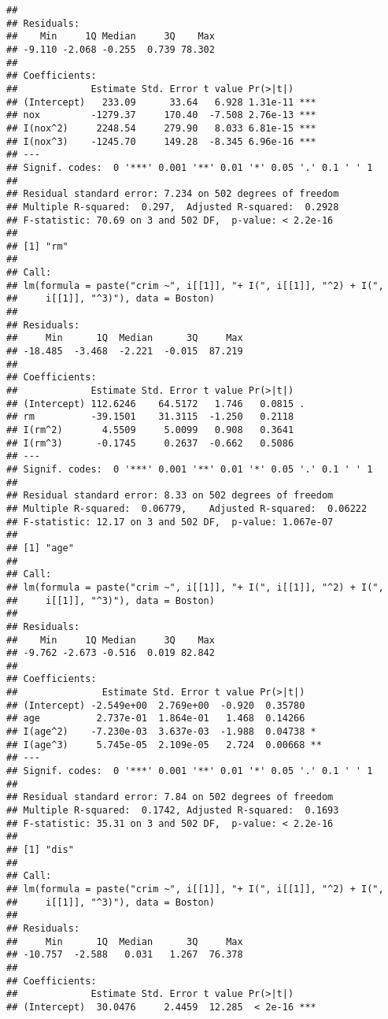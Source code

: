 \documentclass[
]{article}
\begin{document}
\begin{verbatim}
## 
## Residuals:
##    Min     1Q Median     3Q    Max 
## -9.110 -2.068 -0.255  0.739 78.302 
## 
## Coefficients:
##             Estimate Std. Error t value Pr(>|t|)    
## (Intercept)   233.09      33.64   6.928 1.31e-11 ***
## nox         -1279.37     170.40  -7.508 2.76e-13 ***
## I(nox^2)     2248.54     279.90   8.033 6.81e-15 ***
## I(nox^3)    -1245.70     149.28  -8.345 6.96e-16 ***
## ---
## Signif. codes:  0 '***' 0.001 '**' 0.01 '*' 0.05 '.' 0.1 ' ' 1
## 
## Residual standard error: 7.234 on 502 degrees of freedom
## Multiple R-squared:  0.297,  Adjusted R-squared:  0.2928 
## F-statistic: 70.69 on 3 and 502 DF,  p-value: < 2.2e-16
## 
## [1] "rm"
## 
## Call:
## lm(formula = paste("crim ~", i[[1]], "+ I(", i[[1]], "^2) + I(", 
##     i[[1]], "^3)"), data = Boston)
## 
## Residuals:
##     Min      1Q  Median      3Q     Max 
## -18.485  -3.468  -2.221  -0.015  87.219 
## 
## Coefficients:
##             Estimate Std. Error t value Pr(>|t|)  
## (Intercept) 112.6246    64.5172   1.746   0.0815 .
## rm          -39.1501    31.3115  -1.250   0.2118  
## I(rm^2)       4.5509     5.0099   0.908   0.3641  
## I(rm^3)      -0.1745     0.2637  -0.662   0.5086  
## ---
## Signif. codes:  0 '***' 0.001 '**' 0.01 '*' 0.05 '.' 0.1 ' ' 1
## 
## Residual standard error: 8.33 on 502 degrees of freedom
## Multiple R-squared:  0.06779,    Adjusted R-squared:  0.06222 
## F-statistic: 12.17 on 3 and 502 DF,  p-value: 1.067e-07
## 
## [1] "age"
## 
## Call:
## lm(formula = paste("crim ~", i[[1]], "+ I(", i[[1]], "^2) + I(", 
##     i[[1]], "^3)"), data = Boston)
## 
## Residuals:
##    Min     1Q Median     3Q    Max 
## -9.762 -2.673 -0.516  0.019 82.842 
## 
## Coefficients:
##               Estimate Std. Error t value Pr(>|t|)   
## (Intercept) -2.549e+00  2.769e+00  -0.920  0.35780   
## age          2.737e-01  1.864e-01   1.468  0.14266   
## I(age^2)    -7.230e-03  3.637e-03  -1.988  0.04738 * 
## I(age^3)     5.745e-05  2.109e-05   2.724  0.00668 **
## ---
## Signif. codes:  0 '***' 0.001 '**' 0.01 '*' 0.05 '.' 0.1 ' ' 1
## 
## Residual standard error: 7.84 on 502 degrees of freedom
## Multiple R-squared:  0.1742, Adjusted R-squared:  0.1693 
## F-statistic: 35.31 on 3 and 502 DF,  p-value: < 2.2e-16
## 
## [1] "dis"
## 
## Call:
## lm(formula = paste("crim ~", i[[1]], "+ I(", i[[1]], "^2) + I(", 
##     i[[1]], "^3)"), data = Boston)
## 
## Residuals:
##     Min      1Q  Median      3Q     Max 
## -10.757  -2.588   0.031   1.267  76.378 
## 
## Coefficients:
##             Estimate Std. Error t value Pr(>|t|)    
## (Intercept)  30.0476     2.4459  12.285  < 2e-16 ***

\end{verbatim}
\end{document}
